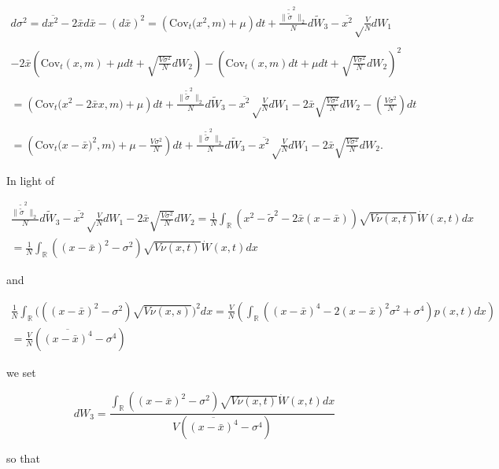 \documentclass[]{article}
\begin{document}
\begin{multline}
d\sigma^2=d\overline{x^2}-2\bar xd\bar x-(d\bar x)^2
=\left(\mathrm{Cov}_t\Big(x^2,m\Big) + \mu \right)dt+\frac{\|\tilde{\tilde\sigma}^2\|_2}{N}d\tilde W_3-\overline{x^2}\sqrt\frac{V}{N}d W_1 \\ \\
-2\bar x\left(\mathrm{Cov}_t(x,m)+\mu dt+\sqrt{\frac{V\sigma^2}{N}}d W_2\right)-\left(\mathrm{Cov}_t(x,m)dt+\mu dt+\sqrt{\frac{V\sigma^2}{N}}d W_2\right)^2 \\ \\
=\left(\mathrm{Cov}_t\Big(x^2-2\bar xx,m\Big) + \mu \right)dt+\frac{\|\tilde{\tilde\sigma}^2\|_2}{N}d\tilde W_3-\overline{x^2}\sqrt\frac{V}{N}d W_1-2\bar x\sqrt{\frac{V\sigma^2}{N}}d W_2-\left(\frac{V\sigma^2}{N}\right)dt \\ \\
=\left(\mathrm{Cov}_t\Big(x-\bar x)^2,m\Big) + \mu - \frac{V\sigma^2}{N}\right)dt+\frac{\|\tilde{\tilde\sigma}^2\|_2}{N}d\tilde W_3-\overline{x^2}\sqrt\frac{V}{N}d W_1-2\bar x\sqrt{\frac{V\sigma^2}{N}}d W_2.
\end{multline}

In light of

\begin{multline}
\frac{\|\tilde{\tilde\sigma}^2\|_2}{N}d\tilde W_3-\overline{x^2}\sqrt\frac{V}{N}d W_1-2\bar x\sqrt{\frac{V\sigma^2}{N}}d W_2=\frac{1}{N}\int_\mathbb{R}\left(x^2-\tilde\sigma^2-2\bar x(x-\bar x)\right)\sqrt{V\nu(x,t)}\dot W(x,t)dx \\
=\frac{1}{N}\int_\mathbb{R}\left((x-\bar x)^2-\sigma^2\right)\sqrt{V\nu(x,t)}\dot W(x,t)dx
\end{multline}

and

\begin{multline}
\frac{1}{N}\int_\mathbb{R}\Big(\left((x-\bar x)^2-\sigma^2\right)\sqrt{V\nu(x,s)}\Big)^2dx
=\frac{V}{N}\left(\int_\mathbb{R}((x-\bar x)^4-2(x-\bar x)^2\sigma^2+\sigma^4)p(x,t)dx\right) \\
=\frac{V}{N}\left(\overline{(x-\bar x)^4}-\sigma^4\right)
\end{multline}

we set

\begin{equation}
d W_3=\frac{\int_\mathbb{R}\left((x-\bar x)^2-\sigma^2\right)\sqrt{V\nu(x,t)}\dot W(x,t)dx}{V\left(\overline{(x-\bar x)^4}-\sigma^4\right)}
\end{equation}

so that
\end{document}
